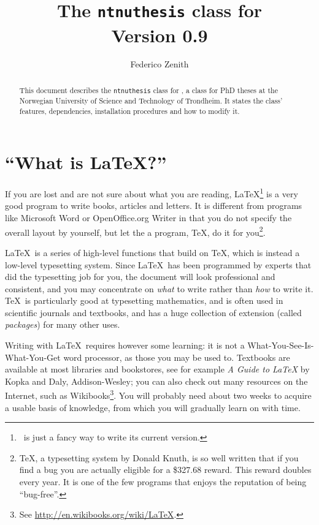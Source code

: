 \documentclass[a4paper,10pt]{article}
\title{The \texttt{ntnuthesis} class for \LaTeXe\\Version 0.9}
\author{Federico Zenith}
\begin{document}
\maketitle

\begin{abstract}
This document describes the \texttt{ntnuthesis} class for \LaTeXe , a class for PhD theses at the Norwegian University of Science and Technology of Trondheim. It states the class' features, dependencies, installation procedures and how to modify it.
\end{abstract}

\section*{``What is \LaTeX?''}
If you are lost and are not sure about what you are reading, \LaTeX\footnote{\LaTeXe\ is just a fancy way to write its current version.} is a very good program to write books, articles and letters. It is different from programs like Microsoft Word or OpenOffice.org Writer in that you do not specify the overall layout by yourself, but let the a program, \TeX, do it for you\footnote{\TeX, a typesetting system by Donald Knuth, is so well written that if you find a bug you are actually eligible for a \$327.68 reward. This reward doubles every year. It is one of the few programs that enjoys the reputation of being ``bug-free''.}.

\LaTeX\ is a series of high-level functions that build on \TeX, which is instead a low-level typesetting system. Since \LaTeX\ has been programmed by experts that did the typesetting job for you, the document will look professional and consistent, and you may concentrate on \emph{what} to write rather than \emph{how} to write it. \TeX\ is particularly good at typesetting mathematics, and is often used in scientific journals and textbooks, and has a huge collection of extension (called \emph{packages}) for many other uses.

Writing with \LaTeX\ requires however some learning: it is not a What-You-See-Is-What-You-Get word processor, as those you may be used to. Textbooks are available at most libraries and bookstores, see for example \emph{A Guide to \LaTeX} by Kopka and Daly, Addison-Wesley; you can also check out many resources on the Internet, such as Wikibooks\footnote{See \url{http://en.wikibooks.org/wiki/LaTeX}.}. You will probably need about two weeks to acquire a usable basis of knowledge, from which you will gradually learn on with time.
\end{document}
